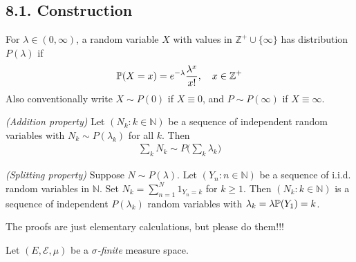 \documentclass[12pt,a4paper]{report}
\begin{document}
\subsection*{8.1. Construction}

For $\lambda \in (0,\infty)$, a random variable $X$ with values in $\mathbb{Z}^+ \cup \{\infty \}$ has distribution $P(\lambda)$ if
\begin{align*}
\mathbb{P}(X = x) = e^{-\lambda} \frac{\lambda^x}{x!}, \quad x\in \mathbb{Z}^+
\end{align*}
Also conventionally write $X \sim P(0)$ if $X \equiv 0$, and $P \sim P(\infty) $ if $X \equiv \infty$.
\s

\emph{(Addition property)} Let $(N_k : k\in \mathbb{N})$ be a sequence of independent random variables with $N_k \sim P(\lambda_k)$ for all $k$. Then 
\begin{align*}
\sum_{k} N_k \sim P \big( \sum_k \lambda_k \big)
\end{align*}
\s

\emph{(Splitting property)} Suppose $N\sim P(\lambda)$. Let $(Y_n : n\in \mathbb{N})$ be a sequence of i.i.d. random variables in $\mathbb{N}$. Set $N_k = \sum_{n=1}^N 1_{Y_n =k}$ for $k\geq 1$. Then $(N_k : k\in \mathbb{N})$ is a sequence of independent $P(\lambda_k)$ random variables with $\lambda_k = \lambda \mathbb{P}(Y_1) =k$.
\s

The proofs are just elementary calculations, but please do them!!!
\s

Let $(E, \mathscr{E}, \mu)$ be a \emph{$\sigma$-finite} measure space.
\end{document}
